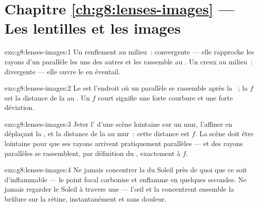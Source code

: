 \section*{Chapitre \ref{ch:g8:lenses-images} --- Les lentilles et les images}

\begin{solution}{exo:g8:lenses-images:1}
Un renflement au milieu~: convergente --- elle rapproche les rayons
d'un  parallèle les uns des autres et les rassemble au .
Un creux au milieu~: divergente --- elle ouvre le  en
éventail.
\end{solution}

\begin{solution}{exo:g8:lenses-images:2}
Le  est l'endroit où un  parallèle se rassemble après la
~; la  $f$ est la distance de la  au
. Un $f$ court signifie une forte courbure et une forte
déviation.
\end{solution}

\begin{solution}{exo:g8:lenses-images:3}
Jeter l' d'une scène lointaine sur un mur, l'affiner en déplaçant
la , et  la distance de la  au mur~: cette
distance est $f$. La scène doit être lointaine pour que ses rayons
arrivent pratiquement parallèles --- et des rayons parallèles se
rassemblent, par définition du , exactement à $f$.
\end{solution}

\begin{solution}{exo:g8:lenses-images:4}
Ne jamais concentrer la  du Soleil près de quoi que ce soit
d'inflammable --- le point focal carbonise et enflamme en quelques
secondes. Ne jamais regarder le Soleil à travers une  ---
l'œil et la  concentrent ensemble la brûlure sur la rétine,
instantanément et sans douleur.
\end{solution}

